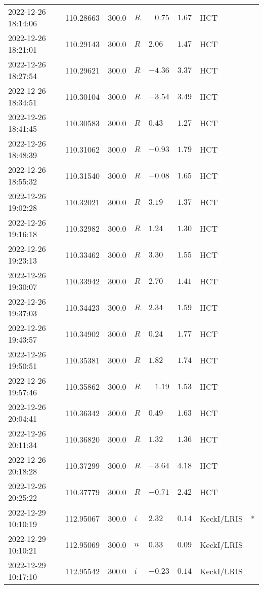 \documentclass{nature_plusfigure}
\begin{document}
\begin{supplement}
\begin{center}
\begin{longtable}{llllllll}
2022-12-26 18:14:06 & 110.28663 & 300.0 & $R$ & $-0.75$ & $1.67$ & HCT &  \\ 
2022-12-26 18:21:01 & 110.29143 & 300.0 & $R$ & $2.06$ & $1.47$ & HCT &  \\ 
2022-12-26 18:27:54 & 110.29621 & 300.0 & $R$ & $-4.36$ & $3.37$ & HCT &  \\ 
2022-12-26 18:34:51 & 110.30104 & 300.0 & $R$ & $-3.54$ & $3.49$ & HCT &  \\ 
2022-12-26 18:41:45 & 110.30583 & 300.0 & $R$ & $0.43$ & $1.27$ & HCT &  \\ 
2022-12-26 18:48:39 & 110.31062 & 300.0 & $R$ & $-0.93$ & $1.79$ & HCT &  \\ 
2022-12-26 18:55:32 & 110.31540 & 300.0 & $R$ & $-0.08$ & $1.65$ & HCT &  \\ 
2022-12-26 19:02:28 & 110.32021 & 300.0 & $R$ & $3.19$ & $1.37$ & HCT &  \\ 
2022-12-26 19:16:18 & 110.32982 & 300.0 & $R$ & $1.24$ & $1.30$ & HCT &  \\ 
2022-12-26 19:23:13 & 110.33462 & 300.0 & $R$ & $3.30$ & $1.55$ & HCT &  \\ 
2022-12-26 19:30:07 & 110.33942 & 300.0 & $R$ & $2.70$ & $1.41$ & HCT &  \\ 
2022-12-26 19:37:03 & 110.34423 & 300.0 & $R$ & $2.34$ & $1.59$ & HCT &  \\ 
2022-12-26 19:43:57 & 110.34902 & 300.0 & $R$ & $0.24$ & $1.77$ & HCT &  \\ 
2022-12-26 19:50:51 & 110.35381 & 300.0 & $R$ & $1.82$ & $1.74$ & HCT &  \\ 
2022-12-26 19:57:46 & 110.35862 & 300.0 & $R$ & $-1.19$ & $1.53$ & HCT &  \\ 
2022-12-26 20:04:41 & 110.36342 & 300.0 & $R$ & $0.49$ & $1.63$ & HCT &  \\ 
2022-12-26 20:11:34 & 110.36820 & 300.0 & $R$ & $1.32$ & $1.36$ & HCT &  \\ 
2022-12-26 20:18:28 & 110.37299 & 300.0 & $R$ & $-3.64$ & $4.18$ & HCT &  \\ 
2022-12-26 20:25:22 & 110.37779 & 300.0 & $R$ & $-0.71$ & $2.42$ & HCT &  \\ 
2022-12-29 10:10:19 & 112.95067 & 300.0 & $i$ & $2.32$ & $0.14$ & KeckI/LRIS & * \\ 
2022-12-29 10:10:21 & 112.95069 & 300.0 & $u$ & $0.33$ & $0.09$ & KeckI/LRIS &  \\ 
2022-12-29 10:17:10 & 112.95542 & 300.0 & $i$ & $-0.23$ & $0.14$ & KeckI/LRIS &  \\ 

\end{longtable}
\end{center}
\end{supplement}
\end{document}
